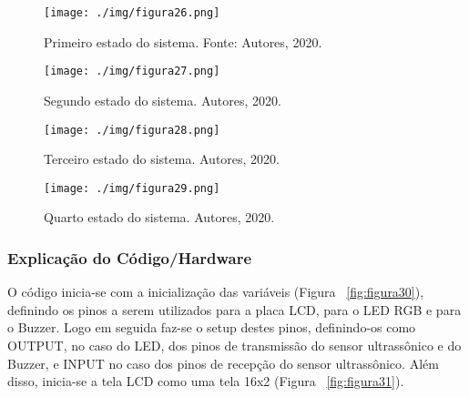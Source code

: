 \documentclass[10pt,twocolumn,letterpaper]{article}
\begin{document}
{
\begin{figure}[!h]
\begin{center}
   \texttt{[image: ./img/figura26.png]}
\end{center}
   \caption{  Primeiro estado do sistema. Fonte: Autores, 2020.  }
\label{fig:figura26}
\end{figure}
} 
{
\begin{figure}[!h]
\begin{center}
   \texttt{[image: ./img/figura27.png]}
\end{center}
   \caption{  Segundo estado do sistema. Autores, 2020.  }
\label{fig:figura27}
\end{figure}
} 
{
\begin{figure}[!h]
\begin{center}
   \texttt{[image: ./img/figura28.png]}
\end{center}
   \caption{   Terceiro estado do sistema. Autores, 2020.  }
\label{fig:figura28}
\end{figure}
} 
{
\begin{figure}[!h]
\begin{center}
   \texttt{[image: ./img/figura29.png]}
\end{center}
   \caption{  Quarto estado do sistema. Autores, 2020.  }
\label{fig:figura29}
\end{figure}
} 

\subsubsection{Explicação do Código/Hardware}

O código inicia-se com a inicialização das variáveis (Figura ~\ref{fig:figura30}), definindo os pinos a serem utilizados para a placa LCD, para o LED RGB e para o Buzzer. Logo em seguida faz-se o setup destes pinos, definindo-os como OUTPUT, no caso do LED, dos pinos de transmissão do sensor ultrassônico e do Buzzer, e INPUT no caso dos pinos de recepção do sensor ultrassônico. Além disso, inicia-se a tela LCD como uma tela 16x2 (Figura ~\ref{fig:figura31}). 
\end{document}
